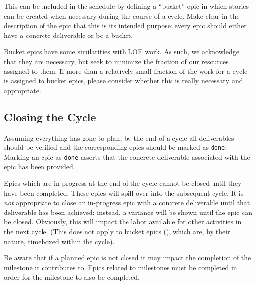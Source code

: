 This can be included in the schedule by defining a ``bucket'' \gls{epic} in which stories can be created when necessary during the course of a \gls{cycle}.
Make clear in the description of the \gls{epic} that this is its intended purpose: every \gls{epic} should either have a concrete deliverable or be a bucket.

Bucket \glspl{epic} have some similarities with \gls{LOE} work.
As such, we acknowledge that they are necessary, but seek to minimize the fraction of our resources assigned to them.
If more than a relatively small fraction of the work for a \gls{cycle} is assigned to bucket \glspl{epic}, please consider whether this is really necessary and appropriate.



\subsection{Closing the Cycle} \label{sec:cycle-close}

Assuming everything has gone to plan, by the end of a \gls{cycle} all deliverables should be verified and the corresponding \glspl{epic} should be marked as \texttt{done}.
Marking an \gls{epic} as \texttt{done} asserts that the concrete deliverable associated with the \gls{epic} has been provided.

Epics which are in progress at the end of the \gls{cycle} cannot be closed until they have been completed.
These \glspl{epic} will spill over into the subsequent \gls{cycle}.
It is \emph{not} appropriate to close an in-progress \gls{epic} with a concrete deliverable until that deliverable has been achieved: instead, a variance will be shown until the \gls{epic} can be closed.
Obviously, this will impact the labor available for other activities in the next \gls{cycle}.
(This does not apply to bucket \glspl{epic} (), which are, by their nature, \gls{timebox}ed within the \gls{cycle}).

Be aware that if a planned \gls{epic} is not closed it may impact the completion of the milestone it contributes to.  Epics related to milestones must be completed in order for the milestone to also be completed.


